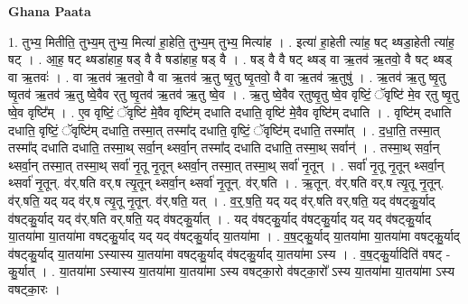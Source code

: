 \documentclass[17pt]{extarticle}
\begin{document}
\textbf{Ghana Paata } \newline

1. तुभ्य॒ मितीति॒ तुभ्य॒म् तुभ्य॒ मित्या॑ हा॒हेति॒ तुभ्य॒म् तुभ्य॒ मित्या॑ह । . इत्या॑ हा॒हेती त्या॑ह॒ षट् थ्षडा॒हेती त्या॑ह॒ षट् । . आ॒ह॒ षट् थ्षडा॑हाह॒ षड् वै वै षडा॑हाह॒ षड् वै । . षड् वै वै षट् थ्षड् वा ऋ॒तव॑ ऋ॒तवो॒ वै षट् थ्षड् वा ऋ॒तवः॑ । . वा ऋ॒तव॑ ऋ॒तवो॒ वै वा ऋ॒तव॑ ऋ॒तु ष्वृ॒तु ष्वृ॒तवो॒ वै वा ऋ॒तव॑ ऋ॒तुषु॑ । . ऋ॒तव॑ ऋ॒तु ष्वृ॒तु ष्वृ॒तव॑ ऋ॒तव॑ ऋ॒तु ष्वे॒वैव र्‌तु ष्वृ॒तव॑ ऋ॒तव॑ ऋ॒तु ष्वे॒व । . ऋ॒तु ष्वे॒वैव र्‌तुष्वृ॒तु ष्वे॒व वृष्टिं॒ ॅवृष्टि॑ मे॒व र्‌तु ष्वृ॒तु ष्वे॒व वृष्टि᳚म् । . ए॒व वृष्टिं॒ ॅवृष्टि॑ मे॒वैव वृष्टि॑म् दधाति दधाति॒ वृष्टि॑ मे॒वैव वृष्टि॑म् दधाति । . वृष्टि॑म् दधाति दधाति॒ वृष्टिं॒ ॅवृष्टि॑म् दधाति॒ तस्मा॒त् तस्मा᳚द् दधाति॒ वृष्टिं॒ ॅवृष्टि॑म् दधाति॒ तस्मा᳚त् । . द॒धा॒ति॒ तस्मा॒त् तस्मा᳚द् दधाति दधाति॒ तस्मा॒थ् सर्वा॒न् थ्सर्वा॒न् तस्मा᳚द् दधाति दधाति॒ तस्मा॒थ् सर्वान्॑ । . तस्मा॒थ् सर्वा॒न् थ्सर्वा॒न् तस्मा॒त् तस्मा॒थ् सर्वा॑ नृ॒तू नृ॒तून् थ्सर्वा॒न् तस्मा॒त् तस्मा॒थ् सर्वा॑ नृ॒तून् । . सर्वा॑ नृ॒तू नृ॒तून् थ्सर्वा॒न् थ्सर्वा॑ नृ॒तून्. व॑र्.षति वर्.ष त्यृ॒तून् थ्सर्वा॒न् थ्सर्वा॑ नृ॒तून्. व॑र्.षति । . ऋ॒तून्. व॑र्.षति वर्.ष त्यृ॒तू नृ॒तून्. व॑र्.षति॒ यद् यद् व॑र्.ष त्यृ॒तू नृ॒तून्. व॑र्.षति॒ यत् । . व॒र्॒.ष॒ति॒ यद् यद् व॑र्.षति वर्.षति॒ यद् व॑षट्कु॒र्याद् व॑षट्कु॒र्याद् यद् व॑र्.षति वर्.षति॒ यद् व॑षट्कु॒र्यात् । . यद् व॑षट्कु॒र्याद् व॑षट्कु॒र्याद् यद् यद् व॑षट्कु॒र्याद् या॒तया॑मा या॒तया॑मा वषट्कु॒र्याद् यद् यद् व॑षट्कु॒र्याद् या॒तया॑मा । . व॒ष॒ट्कु॒र्याद् या॒तया॑मा या॒तया॑मा वषट्कु॒र्याद् व॑षट्कु॒र्याद् या॒तया॑मा ऽस्यास्य या॒तया॑मा वषट्कु॒र्याद् व॑षट्कु॒र्याद् या॒तया॑मा ऽस्य । . व॒ष॒ट्कु॒र्यादिति॑ वषट् - कु॒र्यात् । . या॒तया॑मा ऽस्यास्य या॒तया॑मा या॒तया॑मा ऽस्य वषट्का॒रो व॑षट्का॒रो᳚ ऽस्य या॒तया॑मा या॒तया॑मा ऽस्य वषट्का॒रः । \newline
\end{document}
